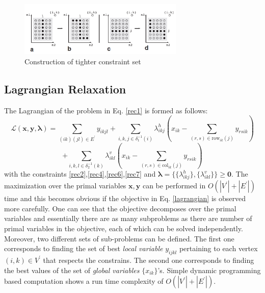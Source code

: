 \begin{figure}[ht]
\centering
 \includegraphics[width=0.7\textwidth]{pic2}
 \caption{Construction of tighter constraint set}
 \label{fig:Construction of tighter constraint set}
\end{figure}

\subsection{Lagrangian Relaxation}
The Lagrangian of the problem in Eq. \ref{rec1} is formed as follows:
\begin{equation}
\label{lagrangian}
\mathcal{L}(\mathbf{x},\mathbf{y},\boldsymbol{\lambda}) = \sum\limits_{(ik)(jl) \in E^{\prime}} y_{ikjl}
+ \displaystyle\sum_{i,k,j\in\delta_{1}^{-1}(i)}\lambda_{ikj}^{h} \left(x_{ik} - \displaystyle\sum_{(r,s)\in\text{row}_{ik}(j)}y_{rsik}\right)
\end{equation}
\begin{equation}
+ \displaystyle\sum_{i,k,l\in\delta_{2}^{-1}(k)}\lambda_{ikl}^{v} \left(x_{ik} - \displaystyle\sum_{(r,s)\in\text{col}_{ik}(j)}y_{rsik}\right)
\end{equation}
with the constraints \ref{rec2},\ref{rec4},\ref{rec6},\ref{rec7} and $\boldsymbol{\lambda} = \{\{\lambda_{ikj}^{h}\}, \{\lambda_{ikl}^{v}\}\}\ge \mathbf{0}$. The maximization over the primal variables
$\mathbf{x},\mathbf{y}$ can be performed in $O(|V^{\prime}|+|E^{\prime}|)$ time and this becomes obvious if the objective in Eq. \ref{lagrangian} is observed more carefully. One can see that the objective decomposes over the primal variables and essentially there are as many subproblems as there are number of primal variables in the objective, each of which can be solved independently. Moreover, two different sets of sub-problems can be defined. The first one corresponds to finding the set of best \emph{local variable} $y_{ijkl}$ pertaining to each vertex $(i,k)\in V^{\prime}$ that respects the constrains. The second one corresponds to finding the best values of the set of \emph{global variables} $\{x_{ik}\}$'s. Simple dynamic programming based computation shows a run time complexity of
$O(|V^{\prime}|+|E^{\prime}|)$.


